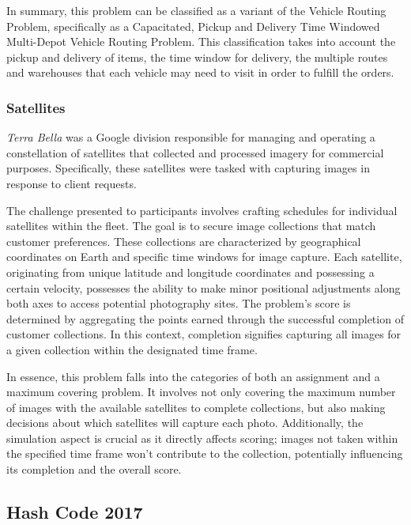 In summary, this problem can be classified as a variant of the Vehicle Routing
Problem, specifically as a Capacitated, Pickup and Delivery Time Windowed
Multi-Depot Vehicle Routing Problem. This classification takes into account the
pickup and delivery of items, the time window for delivery, the multiple routes
and warehouses that each vehicle may need to visit in order to fulfill the
orders.

\subsubsection*{Satellites}
\label{subsubsec:hashcode-2016-final}

\textit{Terra Bella} was a Google division responsible for managing and
operating a constellation of satellites that collected and processed imagery for
commercial purposes. Specifically, these satellites were tasked with capturing
images in response to client requests.

The challenge presented to participants involves crafting schedules for
individual satellites within the fleet. The goal is to secure image collections
that match customer preferences. These collections are characterized by
geographical coordinates on Earth and specific time windows for image capture.
Each satellite, originating from unique latitude and longitude coordinates and
possessing a certain velocity, possesses the ability to make minor positional
adjustments along both axes to access potential photography sites. The problem's
score is determined by aggregating the points earned through the successful
completion of customer collections. In this context, completion signifies
capturing all images for a given collection within the designated time frame.

In essence, this problem falls into the categories of both an assignment and a
maximum covering problem. It involves not only covering the maximum number of
images with the available satellites to complete collections, but also making
decisions about which satellites will capture each photo. Additionally, the
simulation aspect is crucial as it directly affects scoring; images not taken
within the specified time frame won't contribute to the collection, potentially
influencing its completion and the overall score.

\subsection{Hash Code 2017}
\label{subsec:hashcode-2017}

